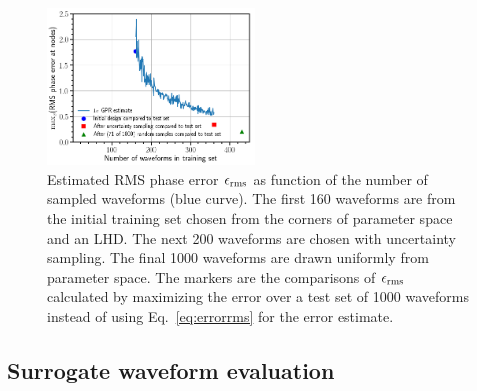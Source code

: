 \documentclass[prd,aps,letter,twocolumn,floatfix,notitlepage,nofootinbib]{revtex4-1}
\begin{document}
\begin{figure}[htb]
\centering
\includegraphics[width=0.49\textwidth]{uncertaintysampling.png}
\caption{Estimated RMS phase error $\epsilon_{\rm rms}$ as function of the number of sampled waveforms (blue curve). The first 160 waveforms are from the initial training set chosen from the corners of parameter space and an LHD. The next 200 waveforms are chosen with uncertainty sampling. The final 1000 waveforms are drawn uniformly from parameter space. The markers are the comparisons of $\epsilon_{\rm rms}$ calculated by maximizing the error over a test set of 1000 waveforms instead of using Eq.~\eqref{eq:errorrms} for the error estimate.}
\label{fig:uncsamp}
\end{figure}


\subsection{Surrogate waveform evaluation}
\end{document}
